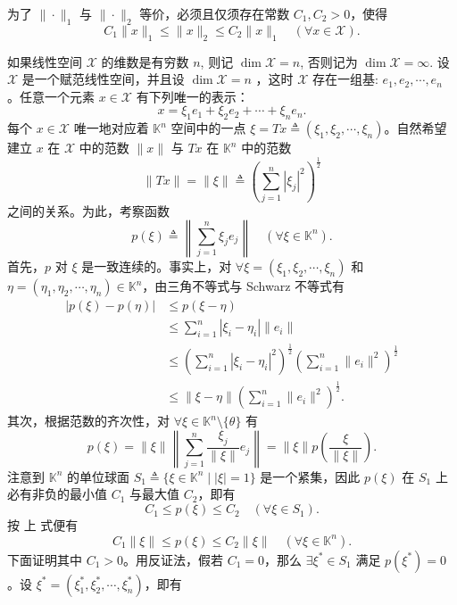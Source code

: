 \documentclass[lang=cn,newtx,10pt,scheme=chinese,thmcnt=chapter]{elegantbook}
\begin{document}
\begin{corollary}
为了 \(\|\cdot\|_1\) 与 \(\|\cdot\|_2\) 等价，必须且仅须存在常数 \(C_1, C_2 > 0\)，使得
\[
C_1\|x\|_1 \leqslant \|x\|_2 \leqslant C_2\|x\|_1 \quad (\forall x \in \mathscr{X}).
\]
\end{corollary}
如果线性空间 $\mathscr{X}$ 的维数是有穷数 $n$, 则记 $\operatorname{dim} \mathscr{X} =n$, 否则记为 $\operatorname{dim} \mathscr{X} =\infty$. 设 $\mathscr{X}$ 是一个赋范线性空间，并且设 $\operatorname{dim} \mathscr{X} =n$ ，这时 $\mathscr{X}$ 存在一组基: $e_1, e_2, \cdots, e_n$ 。任意一个元素 $x \in \mathscr{X}$ 有下列唯一的表示：
\begin{equation*}
x=\xi_1 e_1+\xi_2 e_2+\cdots+\xi_n e_n .
\end{equation*}
每个 \(x \in \mathscr{\mathscr{X}}\) 唯一地对应着 \(\mathbb{K}^n\) 空间中的一点 \(\xi = T x \triangleq (\xi_1, \xi_2, \cdots, \xi_n)\)。自然希望建立 \(x\) 在 \(\mathscr{X}\) 中的范数 \(\|x\|\) 与 \(T x\) 在 \(\mathbb{K}^n\) 中的范数
\[
\|T x\| = \|\xi\| \triangleq \left( \sum_{j=1}^n |\xi_j|^2 \right)^{\frac{1}{2}}
\]
之间的关系。为此，考察函数
\[
p(\xi) \triangleq \left\|\sum_{j=1}^n \xi_j e_j\right\| \quad (\forall \xi \in \mathbb{K}^n).
\]
首先，\(p\) 对 \(\xi\) 是一致连续的。事实上，对 \(\forall \xi = (\xi_1, \xi_2, \cdots, \xi_n)\) 和 \(\eta = (\eta_1, \eta_2, \cdots, \eta_n) \in \mathbb{K}^n\)，由三角不等式与 Schwarz 不等式有
\[
\begin{aligned}
|p(\xi) - p(\eta)| &\leqslant p(\xi - \eta) \\
&\leqslant \sum_{i=1}^n |\xi_i - \eta_i| \|e_i\| \\
&\leqslant \left( \sum_{i=1}^n |\xi_i - \eta_i|^2 \right)^{\frac{1}{2}} \left( \sum_{i=1}^n \|e_i\|^2 \right)^{\frac{1}{2}} \\
&\leqslant \|\xi - \eta\| \left( \sum_{i=1}^n \|e_i\|^2 \right)^{\frac{1}{2}}.
\end{aligned}
\]
其次，根据范数的齐次性，对 \(\forall \xi \in \mathbb{K}^n \setminus \{\theta\}\) 有
\[
p(\xi) = \|\xi\| \left\|\sum_{j=1}^n \frac{\xi_j}{\|\xi\|} e_j\right\| = \|\xi\| p\left(\frac{\xi}{\|\xi\|}\right).
\]
注意到 \(\mathbb{K}^n\) 的单位球面 \(S_1 \triangleq \{\xi \in \mathbb{K}^n \mid |\xi| = 1\}\) 是一个紧集，因此 \(p(\xi)\) 在 \(S_1\) 上必有非负的最小值 \(C_1\) 与最大值 \(C_2\)，即有
\[
C_1 \leqslant p(\xi) \leqslant C_2 \quad (\forall \xi \in S_1).
\]
按 上 式便有
\[
C_1 \|\xi\| \leqslant p(\xi) \leqslant C_2 \|\xi\| \quad (\forall \xi \in \mathbb{K}^n).
\]
下面证明其中 \(C_1 > 0\)。用反证法，假若 \(C_1 = 0\)，那么 \(\exists \xi^* \in S_1\) 满足 \(p(\xi^*) = 0\)。设 \(\xi^* = (\xi_1^*, \xi_2^*, \cdots, \xi_n^*)\)，即有
\end{document}
